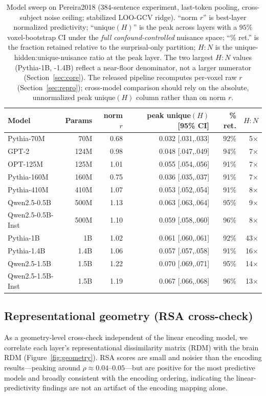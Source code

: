 \documentclass{article}
\begin{document}
\begin{table}[t]
\caption{Model sweep on Pereira2018 ($384$-sentence experiment, last-token pooling,
cross-subject noise ceiling; stabilized LOO-GCV ridge). ``norm $r$'' is best-layer normalized
predictivity; ``unique$(H)$'' is the peak across layers with a $95\%$ voxel-bootstrap CI under
the \emph{full confound-controlled} nuisance space; ``\% ret.'' is the fraction retained relative
to the surprisal-only partition; $H{:}N$ is the unique-hidden:unique-nuisance ratio at the peak
layer. The two largest $H{:}N$ values (Pythia-1B, -1.4B) reflect a near-floor denominator, not a
larger numerator (Section~\ref{sec:core}). The released pipeline recomputes per-voxel raw $r$
(Section~\ref{sec:repro}); cross-model comparison should rely on the absolute, unnormalized peak
unique$(H)$ column rather than on norm $r$.}
\label{tab:sweep}
\centering
\begin{tabular}{lrrrrr}
\toprule
Model & Params & norm $r$ & peak unique$(H)$ [95\% CI] & \% ret. & $H{:}N$ \\
\midrule
Pythia-70M        & 70M   & 0.68 & 0.032 [.031,.033] & 92\% & 5$\times$ \\
GPT-2             & 124M  & 0.98 & 0.048 [.047,.049] & 94\% & 7$\times$ \\
OPT-125M          & 125M  & 1.01 & 0.055 [.054,.056] & 91\% & 7$\times$ \\
Pythia-160M       & 160M  & 0.75 & 0.036 [.035,.037] & 91\% & 7$\times$ \\
Pythia-410M       & 410M  & 1.07 & 0.053 [.052,.054] & 91\% & 8$\times$ \\
Qwen2.5-0.5B      & 500M  & 1.13 & 0.063 [.063,.064] & 95\% & 9$\times$ \\
Qwen2.5-0.5B-Inst & 500M  & 1.10 & 0.059 [.058,.060] & 96\% & 8$\times$ \\
Pythia-1B         & 1B    & 1.02 & 0.061 [.060,.061] & 92\% & 43$\times$ \\
Pythia-1.4B       & 1.4B  & 1.06 & 0.057 [.057,.058] & 91\% & 16$\times$ \\
Qwen2.5-1.5B      & 1.5B  & 1.22 & 0.070 [.069,.071] & 95\% & 14$\times$ \\
Qwen2.5-1.5B-Inst & 1.5B  & 1.19 & 0.067 [.066,.068] & 96\% & 13$\times$ \\
\bottomrule
\end{tabular}
\end{table}

\subsection{Representational geometry (RSA cross-check)}
\label{sec:rsa}
As a geometry-level cross-check independent of the linear encoding model, we correlate each
layer's representational dissimilarity matrix (RDM) with the brain RDM
(Figure~\ref{fig:geometry}). RSA scores are small and noisier than the encoding
results---peaking around $\rho \approx 0.04$--$0.05$---but are positive for the most predictive
models and broadly consistent with the encoding ordering, indicating the linear-predictivity
findings are not an artifact of the encoding mapping alone.
\end{document}
